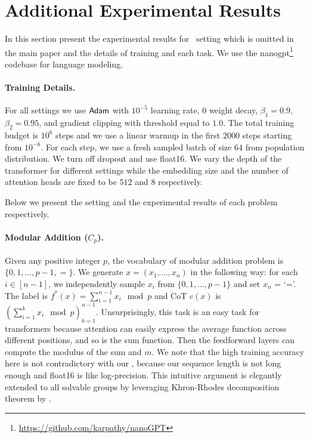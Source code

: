\section{Additional Experimental Results}\label{appsec:additional_exp}

In this section present the experimental results for \base\ setting which is omitted in the main paper and the details of training and each task. We use the \textsf{nanogpt}\footnote{\url{https://github.com/karpathy/nanoGPT}} codebase for language modeling.


\paragraph{Training Details.} For all settings we use $\mathsf{Adam}$ with $10^{-5}$ learning rate, $0$ weight decay, $\beta_1 = 0.9$, $\beta_2=0.95$, and gradient clipping with threshold equal to $1.0$. The total training budget is $10^6$ steps and we use a linear warmup in the first $2000$ steps starting from $10^{-6}$. For each step, we use a fresh sampled batch of size $64$ from population distribution. We turn off dropout and use \textsf{float16}.  We vary the depth of the transformer for different settings while the embedding size and the number of attention heads are fixed to be $512$ and $8$ respectively. 


Below we present the setting and the experimental results of each problem respectively. 

\paragraph{Modular Addition ($C_p$).} Given any positive integer $p$, the vocabulary of modular addition problem is $\{0,1,\ldots,p-1,=\}$. We generate $x=(x_1,\ldots, x_n)$ in the following way: for each $i\in[n-1]$, we independently sample $x_i$ from $\{0,1,\ldots,p-1\}$ and set $x_n$ = `='. The label is $f^*(x) = \sum_{i=1}^{n-1}x_i\mod p$ and CoT $c(x)$ is $(\sum_{i=1}^{k}x_i\mod p)_{k=1}^{n-1}$.
	Unsurprisingly, this task is an easy task for transformers because attention can easily express the average function across different positions, and so is the sum function.  Then the feedforward layers can compute the modulus of the sum and $m$. We note that the high training accuracy here is not contradictory with our , because our sequence length is not long enough and \textsf{float16} is like log-precision. This intuitive argument is elegantly extended to all solvable groups by leveraging Khron-Rhodes decomposition theorem by \citet{liu2022transformers}. 

